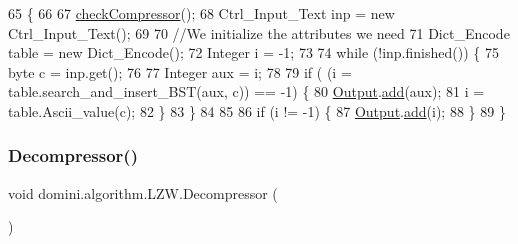 \begin{DoxyCode}
65                              \{
66 
67         \hyperlink{classdomini_1_1algorithm_1_1Algorithm_a070b7e7dcc453b03751d265beae5306c}{checkCompressor}();
68         Ctrl\_Input\_Text inp = \textcolor{keyword}{new} Ctrl\_Input\_Text();
69 
70         \textcolor{comment}{//We initialize the attributes we need}
71         Dict\_Encode table = \textcolor{keyword}{new} Dict\_Encode();
72         Integer i = -1;
73         
74         \textcolor{keywordflow}{while} (!inp.finished()) \{
75             byte c = inp.get();
76 
77             Integer aux = i;
78 
79             \textcolor{keywordflow}{if} ( (i = table.search\_and\_insert\_BST(aux, c)) == -1) \{
80                 \hyperlink{classdomini_1_1algorithm_1_1Algorithm_a4de9955411c656325adc391ef570c082}{Output}.\hyperlink{classpersistencia_1_1output_1_1Ctrl__Output_a8c5aa5a6acb5259faeb1c05c71ddd21c}{add}(aux);
81                 i = table.Ascii\_value(c);
82             \}
83         \}
84 
85         
86         \textcolor{keywordflow}{if} (i != -1) \{
87             \hyperlink{classdomini_1_1algorithm_1_1Algorithm_a4de9955411c656325adc391ef570c082}{Output}.\hyperlink{classpersistencia_1_1output_1_1Ctrl__Output_a8c5aa5a6acb5259faeb1c05c71ddd21c}{add}(i); 
88         \}
89     \}
\end{DoxyCode}
\mbox{\label{classdomini_1_1algorithm_1_1LZW_a6a5d986396443691861ac9ba41b2dd33}} 
\subsubsection{\texorpdfstring{Decompressor()}{Decompressor()}}
{\footnotesize\ttfamily void domini.\+algorithm.\+L\+Z\+W.\+Decompressor (\begin{DoxyParamCaption}{ }\end{DoxyParamCaption})\hspace{0.3cm}{\ttfamily [inline]}}


